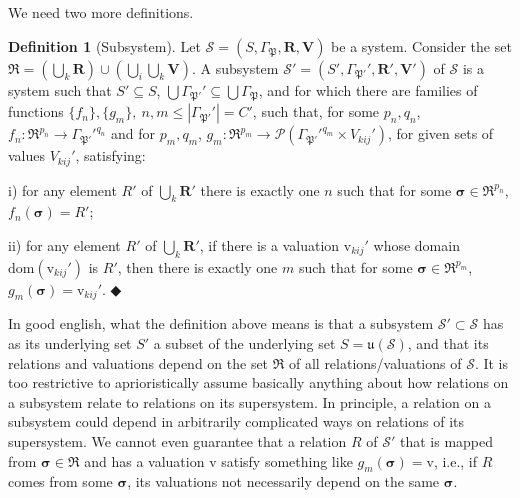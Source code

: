 \documentclass[12pt, a4paper]{article} %
\theoremstyle{definition}
\newtheorem{definition}{Definition}[section]
\begin{document}
	We need two more definitions. 
	
	\begin{definition}[Subsystem] \label{subsys}
		Let $\mathcal{S} = (S, \Gamma_{\mathfrak{P}}, \mathbf{R}, \mathbf{V})$ be a system. Consider the set $\mathfrak{R} = (\bigcup_k \mathbf{R})\cup (\bigcup_i \bigcup_k \mathbf{V})$. A subsystem $\mathcal{S}' = (S',\Gamma_{\mathfrak{P'}}', \mathbf{R'}, \mathbf{V'})$ of $\mathcal{S}$ is a system such that $S' \subseteq S$, $ \bigcup\Gamma_{\mathfrak{P'}}' \subseteq \bigcup\Gamma_{\mathfrak{P}}$, 
		and for which there are families of functions $\{f_n\}, \{g_m\},\ n, m \leq |\Gamma_{\mathfrak{P'}}'| = C'$, such that, for some $p_n, q_n$,  $f_n: \mathfrak{R}^{p_n} \rightarrow \Gamma_{\mathfrak{P'}}'^{q_n}$ and for $p_m, q_m$, $g_m: \mathfrak{R}^{p_m} \rightarrow \mathcal{P}(\Gamma_{\mathfrak{P'}}'^{q_m} \times V_{kij}')$, for given sets of values $V_{kij}'$, satisfying:
		
		i) for any element $R'$ of $\bigcup_k \mathbf{R}'$ there is exactly one $n$ such that for some $\boldsymbol{\sigma} \in \mathfrak{R}^{p_n}$, $f_n(\boldsymbol{\sigma}) = R'$;
		
		ii) for any element $R'$ of $\bigcup_k \mathbf{R}'$, if there is a valuation $\mathrm{v}_{kij}'$ whose domain $\mathrm{dom}(\mathrm{v}_{kij}')$ is $R'$, then there is exactly one $m$ such that for some $\boldsymbol{\sigma} \in \mathfrak{R}^{p_m}$, $g_m(\boldsymbol{\sigma}) = \mathrm{v}_{kij}'$. $\Diamondblack$
	\end{definition}
	
	In good english, what the definition above means is that a subsystem $\mathcal{S}' \subset \mathcal{S}$ has as its underlying set $S'$ a subset of the underlying set $S = \mathfrak{u}(\mathcal{S})$, and that its relations and valuations depend on the set $\mathfrak{R}$ of all relations/valuations of $\mathcal{S}$. It is too restrictive to aprioristically assume basically anything about how relations on a subsystem relate to relations on its supersystem. In principle, a relation on a subsystem could depend in arbitrarily complicated ways on relations of its supersystem. We cannot even guarantee that a relation $R$ of $\mathcal{S}'$ that is mapped from $\boldsymbol{\sigma} \in \mathfrak{R}$ and has a valuation $\mathrm{v}$ satisfy something like $g_m(\boldsymbol{\sigma}) = \mathrm{v}$, i.e., if $R$ comes from some $\boldsymbol{\sigma}$, its valuations not necessarily depend on the same $\boldsymbol{\sigma}$.
	
\end{document}
